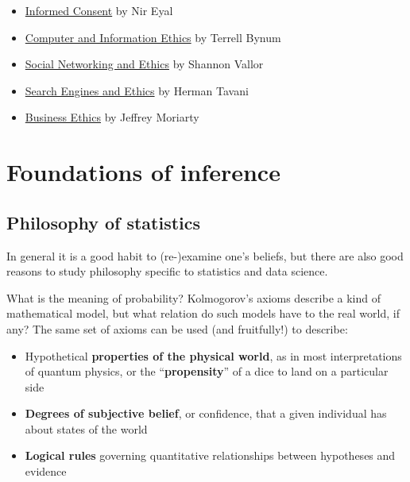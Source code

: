 \documentclass[]{book}
\providecommand{\tightlist}{%
  \setlength{\itemsep}{0pt}\setlength{\parskip}{0pt}}
\theoremstyle{definition}
\theoremstyle{definition}
\theoremstyle{definition}
\theoremstyle{remark}
\begin{document}
\begin{itemize}
\tightlist
\item
  \href{https://plato.stanford.edu/archives/spr2019/entries/informed-consent/}{Informed
  Consent} by Nir Eyal
\item
  \href{https://plato.stanford.edu/archives/sum2018/entries/ethics-computer/}{Computer
  and Information Ethics} by Terrell Bynum
\item
  \href{https://plato.stanford.edu/entries/ethics-social-networking/}{Social
  Networking and Ethics} by Shannon Vallor
\item
  \href{https://plato.stanford.edu/archives/fall2016/entries/ethics-search/}{Search
  Engines and Ethics} by Herman Tavani
\item
  \href{https://plato.stanford.edu/archives/fall2017/entries/ethics-business/}{Business
  Ethics} by Jeffrey Moriarty
\end{itemize}

\chapter{Foundations of inference}\label{foundations-of-inference}

\section{Philosophy of statistics}\label{philosophy-of-statistics}

In general it is a good habit to (re-)examine one's beliefs, but there
are also good reasons to study philosophy specific to statistics and
data science.

What is the meaning of probability? Kolmogorov's axioms describe a kind
of mathematical model, but what relation do such models have to the real
world, if any? The same set of axioms can be used (and fruitfully!) to
describe:

\begin{itemize}
\tightlist
\item
  Hypothetical \textbf{properties of the physical world}, as in most
  interpretations of quantum physics, or the ``\textbf{propensity}'' of
  a dice to land on a particular side
\item
  \textbf{Degrees of subjective belief}, or confidence, that a given
  individual has about states of the world
\item
  \textbf{Logical rules} governing quantitative relationships between
  hypotheses and evidence
\end{itemize}
\end{document}
